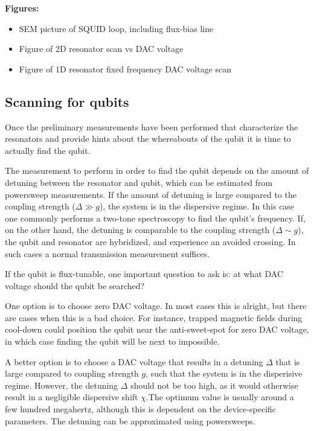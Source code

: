\documentclass[12pt]{report}
\begin{document}
        \textbf{Figures:}
        \begin{itemize}
          \item SEM picture of SQUID loop, including flux-bias line
          \item Figure of 2D resonator scan vs DAC voltage
          \item Figure of 1D resonator fixed frequency DAC voltage scan
        \end{itemize}

      \subsection{Scanning for qubits}
        Once the preliminary measurements have been performed that characterize the resonators and provide hints about the whereabouts of the qubit it is time to actually find the qubit.

        The measurement to perform in order to find the qubit depends on the amount of detuning between the resonator and qubit, which can be estimated from powersweep measurements. If the amount of detuning is large compared to the coupling strength ($\Delta \gg  g$), the system is in the dispersive regime. In this case one commonly performs a two-tone spectroscopy to find the qubit's frequency. If, on the other hand, the detuning is comparable to the coupling strength ($\Delta \sim g$), the qubit and resonator are hybridized, and experience an avoided crossing. In such cases a normal transmission measurement suffices.

        If the qubit is flux-tunable, one important question to ask is: at what DAC voltage should the qubit be searched?

        One option is to choose zero DAC voltage. In most cases this is alright, but there are cases when this is a bad choice. For instance, trapped magnetic fields during cool-down could position the qubit near the anti-sweet-spot for zero DAC voltage, in which case finding the qubit will be next to impossible.

        A better option is to choose a DAC voltage that results in a detuning $\Delta$ that is large compared to coupling strength $g$, such that the system is in the disperisive regime. However, the detuning $\Delta$ should not be too high, as it would otherwise result in a negligible dispersive shift $\chi$.The optimum value is usually around a few hundred megahertz, although this is dependent on the device-specific parameters. The detuning can be approximated using powersweeps.
\end{document}
